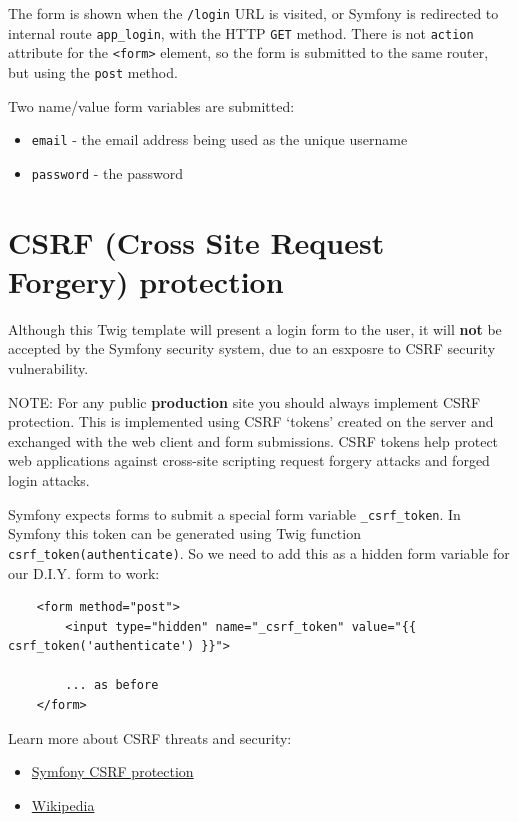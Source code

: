 \documentclass[a4paperpaper,openright]{book}
\providecommand{\tightlist}{%
  \setlength{\itemsep}{0pt}\setlength{\parskip}{0pt}}
\begin{document}
The form is shown when the \texttt{/login} URL is visited, or Symfony is
redirected to internal route \texttt{app\_login}, with the HTTP
\texttt{GET} method. There is not \texttt{action} attribute for the
\texttt{\textless{}form\textgreater{}} element, so the form is submitted
to the same router, but using the \texttt{post} method.

Two name/value form variables are submitted:

\begin{itemize}
\item
  \texttt{email} - the email address being used as the unique username
\item
  \texttt{password} - the password
\end{itemize}

\hypertarget{csrf-cross-site-request-forgery-protection}{%
\section{CSRF (Cross Site Request Forgery)
protection}\label{csrf-cross-site-request-forgery-protection}}

Although this Twig template will present a login form to the user, it
will \textbf{not} be accepted by the Symfony security system, due to an
esxposre to CSRF security vulnerability.

NOTE: For any public \textbf{production} site you should always
implement CSRF protection. This is implemented using CSRF `tokens'
created on the server and exchanged with the web client and form
submissions. CSRF tokens help protect web applications against
cross-site scripting request forgery attacks and forged login attacks.

Symfony expects forms to submit a special form variable
\texttt{\_csrf\_token}. In Symfony this token can be generated using
Twig function
\texttt{csrf\_token(\textquotesingle{}authenticate\textquotesingle{})}.
So we need to add this as a hidden form variable for our D.I.Y. form to
work:

\begin{verbatim}
    <form method="post">
        <input type="hidden" name="_csrf_token" value="{{ csrf_token('authenticate') }}">

        ... as before
    </form>
\end{verbatim}

Learn more about CSRF threats and security:

\begin{itemize}
\tightlist
\item
  \href{https://symfony.com/doc/current/security/csrf.html}{Symfony CSRF
  protection}
\item
  \href{https://en.wikipedia.org/wiki/Cross-site_request_forgery\#Forging_login_requests}{Wikipedia}
\end{itemize}
\end{document}
